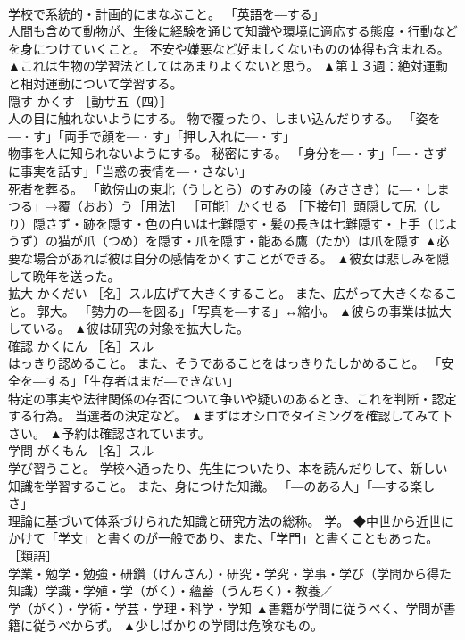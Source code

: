 \documentclass[8pt]{extreport}
\begin{document}
\begin{CJK}{UTF8}{min}
\\	学校で系統的・計画的にまなぶこと。 「英語を―する」 
\\	人間も含めて動物が、生後に経験を通じて知識や環境に適応する態度・行動などを身につけていくこと。 不安や嫌悪など好ましくないものの体得も含まれる。	▲これは生物の学習法としてはあまりよくないと思う。 ▲第１３週：絶対運動と相対運動について学習する。
\\	隠す	かくす	［動サ五（四）］ 
\\	人の目に触れないようにする。 物で覆ったり、しまい込んだりする。 「姿を―・す」「両手で顔を―・す」「押し入れに―・す」 
\\	物事を人に知られないようにする。 秘密にする。 「身分を―・す」「―・さずに事実を話す」「当惑の表情を―・さない」 
\\	死者を葬る。 「畝傍山の東北（うしとら）のすみの陵（みささき）に―・しまつる」→覆（おお）う［用法］ ［可能］かくせる ［下接句］頭隠して尻（しり）隠さず・跡を隠す・色の白いは七難隠す・髪の長きは七難隠す・上手（じようず）の猫が爪（つめ）を隠す・爪を隠す・能ある鷹（たか）は爪を隠す	▲必要な場合があれば彼は自分の感情をかくすことができる。 ▲彼女は悲しみを隠して晩年を送った。
\\	拡大	かくだい	［名］スル広げて大きくすること。 また、広がって大きくなること。 郭大。 「勢力の―を図る」「写真を―する」↔縮小。	▲彼らの事業は拡大している。 ▲彼は研究の対象を拡大した。
\\	確認	かくにん	［名］スル 
\\	はっきり認めること。 また、そうであることをはっきりたしかめること。 「安全を―する」「生存者はまだ―できない」 
\\	特定の事実や法律関係の存否について争いや疑いのあるとき、これを判断・認定する行為。 当選者の決定など。	▲まずはオシロでタイミングを確認してみて下さい。 ▲予約は確認されています。
\\	学問	がくもん	［名］スル 
\\	学び習うこと。 学校へ通ったり、先生についたり、本を読んだりして、新しい知識を学習すること。 また、身につけた知識。 「―のある人」「―する楽しさ」 
\\	理論に基づいて体系づけられた知識と研究方法の総称。 学。 ◆中世から近世にかけて「学文」と書くのが一般であり、また、「学門」と書くこともあった。 ［類語］
\\	学業・勉学・勉強・研鑽（けんさん）・研究・学究・学事・学び（学問から得た知識）学識・学殖・学（がく）・蘊蓄（うんちく）・教養／
\\	学（がく）・学術・学芸・学理・科学・学知	▲書籍が学問に従うべく、学問が書籍に従うべからず。 ▲少しばかりの学問は危険なもの。

\end{CJK}
\end{document}
